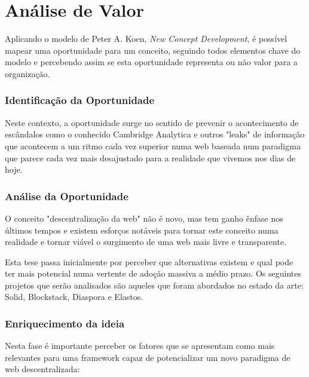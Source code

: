 \chapter{Análise de Valor}
\label{cap:3}

Aplicando o modelo de Peter A. Koen, \emph{New Concept Development}, é possível mapear uma oportunidade para um conceito, seguindo todos elementos chave do modelo e percebendo assim
se esta oportunidade representa ou não valor para a organização.

\subsection{Identificação da Oportunidade}
Neste contexto, a oportunidade surge no sentido de prevenir o acontecimento de escândalos como o conhecido Cambridge Analytica e outros "leaks" \cite{cambridge_analytica} de informação que acontecem a um ritmo cada vez superior numa web baseada num paradigma que parece cada vez mais desajustado para a realidade que vivemos nos dias de hoje.

\subsection{Análise da Oportunidade}
O conceito "descentralização da web" não é novo, mas tem ganho ênfase nos últimos tempos e existem esforços notáveis para tornar este conceito numa realidade e tornar viável o surgimento de uma web mais livre e transparente.

Esta tese passa inicialmente por perceber que alternativas existem e qual pode ter mais potencial numa vertente de adoção massiva a médio prazo. Os seguintes projetos que serão analisados são aqueles que foram abordados no estado da arte: Solid, Blockstack, Diaspora e Elastos.

\subsection{Enriquecimento da ideia}
Nesta fase é importante perceber os fatores que se apresentam como mais relevantes para uma framework capaz de potencializar um novo paradigma de web descentralizada:

